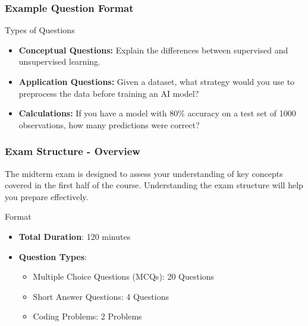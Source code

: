 \documentclass[aspectratio=169]{beamer}
\begin{document}
\begin{frame}[fragile]
    \frametitle{Example Question Format}
    \begin{block}{Types of Questions}
        \begin{itemize}
            \item \textbf{Conceptual Questions:} Explain the differences between supervised and unsupervised learning.
            \item \textbf{Application Questions:} Given a dataset, what strategy would you use to preprocess the data before training an AI model?
            \item \textbf{Calculations:} If you have a model with 80\% accuracy on a test set of 1000 observations, how many predictions were correct?
        \end{itemize}
    \end{block}
\end{frame}

\begin{frame}[fragile]
    \frametitle{Exam Structure - Overview}
    The midterm exam is designed to assess your understanding of key concepts covered in the first half of the course. Understanding the exam structure will help you prepare effectively.
    
    \begin{block}{Format}
        \begin{itemize}
            \item \textbf{Total Duration}: 120 minutes
            \item \textbf{Question Types}: 
            \begin{itemize}
                \item Multiple Choice Questions (MCQs): 20 Questions
                \item Short Answer Questions: 4 Questions
                \item Coding Problems: 2 Problems
            \end{itemize}
        \end{itemize}
    \end{block}
\end{frame}
\end{document}
